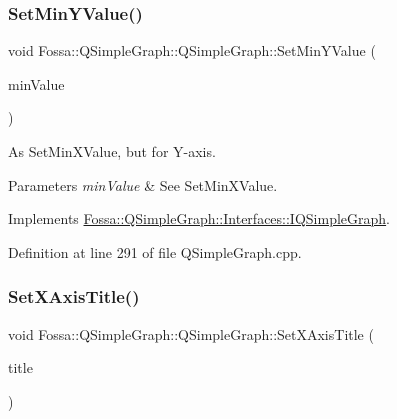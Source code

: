 \subsubsection{\texorpdfstring{Set\+Min\+Y\+Value()}{SetMinYValue()}}
{\footnotesize\ttfamily void Fossa\+::\+Q\+Simple\+Graph\+::\+Q\+Simple\+Graph\+::\+Set\+Min\+Y\+Value (\begin{DoxyParamCaption}\item[{double}]{min\+Value }\end{DoxyParamCaption})\hspace{0.3cm}{\ttfamily [virtual]}}



As Set\+Min\+X\+Value, but for Y-\/axis. 


\begin{DoxyParams}{Parameters}
{\em min\+Value} & See Set\+Min\+X\+Value. \\
\hline
\end{DoxyParams}


Implements \hyperlink{class_fossa_1_1_q_simple_graph_1_1_interfaces_1_1_i_q_simple_graph_a3fdd1f6b538e2dfbf4a0140acd6b6e94}{Fossa\+::\+Q\+Simple\+Graph\+::\+Interfaces\+::\+I\+Q\+Simple\+Graph}.



Definition at line 291 of file Q\+Simple\+Graph.\+cpp.

\mbox{\label{class_fossa_1_1_q_simple_graph_1_1_q_simple_graph_a7579da572b54d43ccec3d2bd572b6cfa}} 
\subsubsection{\texorpdfstring{Set\+X\+Axis\+Title()}{SetXAxisTitle()}}
{\footnotesize\ttfamily void Fossa\+::\+Q\+Simple\+Graph\+::\+Q\+Simple\+Graph\+::\+Set\+X\+Axis\+Title (\begin{DoxyParamCaption}\item[{Q\+String}]{title }\end{DoxyParamCaption})\hspace{0.3cm}{\ttfamily [virtual]}}



